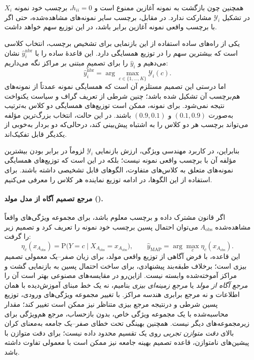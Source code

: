 همچنین چون بازگشت به نمونه آغازین ممنوع است و $h_{ii}=0$، برچسب خود نمونه $X_i$ در تشکیل $\mathscr Y_i$ مشارکت ندارد. در مقابل، برچسب سایر نمونه‌های مشاهده‌شده، حتی اگر با برچسب واقعی نمونه آغازین برابر باشد، در این توزیع سهم خواهد داشت.

یکی از راه‌های ساده استفاده از این بازنمایی برای تشخیص برچسب، انتخاب کلاسی است که بیشترین سهم را در توزیع همسایگی دارد. این قاعدهٔ ساده را با $\widehat y_i^{\mathrm{nbr}}$ نشان می‌دهیم و $\widehat y_i$ را برای تصمیمِ مبتنی بر مراکز نگه می‌داریم:
\begin{equation}\label{eq:ch3-simple-label-decision}
\widehat y_i^{\mathrm{nbr}}=\arg\max_{c\in\{1,\ldots,K\}}\mathscr Y_i(c).
\end{equation}
اما درستی این تصمیم مستلزم آن است که همسایگی نمونه عمدتاً از نمونه‌های هم‌برچسب آن تشکیل شده باشد؛ چنین شرطی از تعریف گراف و سیاست یکنواخت نتیجه نمی‌شود. برای نمونه، ممکن است توزیع‌های همسایگی دو کلاس به‌ترتیب به‌صورت $(0.1,0.9)$ و $(0.9,0.1)$ باشند. در این حالت، انتخاب بزرگ‌ترین مؤلفه می‌تواند برچسب هر دو کلاس را به اشتباه پیش‌بینی کند، درحالی‌که دو بردار به‌خوبی از یکدیگر قابل تفکیک‌اند.

بنابراین، در کاربرد مهندسی ویژگی، ارزش بازنمایی $\mathscr Y_i$ لزوماً در برابر بودن بیشترین مؤلفه آن با برچسب واقعی نمونه نیست؛ بلکه در این است که توزیع‌های همسایگی نمونه‌های متعلق به کلاس‌های متفاوت، الگوهای قابل تشخیصی داشته باشند. برای استفاده از این الگوها، در ادامه توزیع نماینده هر کلاس را معرفی می‌کنیم.


\paragraph{مرجع تصمیم آگاه از مدل مولد ().}
\label{par:ch3-bayes-map-reference}
اگر قانون مشترک داده و برچسب معلوم باشد،
برای مجموعه ویژگی‌های واقعاً مشاهده‌شده
$A_{\mathrm{obs}}$ می‌توان احتمال پسین برچسب
خود نمونه را تعریف کرد و تصمیم زیر را گرفت:
\begin{equation}\label{eq:ch3-bayes-map-decision}
\eta_c(x_{A_{\mathrm{obs}}})
=\mathrm P\bigl(Y=c\mid X_{A_{\mathrm{obs}}}=x_{A_{\mathrm{obs}}}\bigr),
\qquad
\widehat y_{\mathrm{MAP}}
=\arg\max_{c}\eta_c(x_{A_{\mathrm{obs}}}).
\end{equation}
این قاعده، با فرض آگاهی از توزیع واقعی مولد،
برای زیان صفر--یک معمولی تصمیم بیزی است؛
برخلاف طبقه‌بند پیشنهادی، برای ساخت احتمال پسین
به بازنمایی گشت و مراکز آموخته‌شده وابسته نیست.
ازاین‌رو در مقایسه‌های مصنوعی بهتر است
آن را \emph{مرجع آگاه از مولد} یا
\emph{مرجع زمینه‌ای بیزی} بنامیم،
نه یک خط مبنای آموزش‌دیده با همان اطلاعات
و نه مرجع برابری هندسه مراکز.
با تغییر مجموعه ویژگی‌های ورودی، توزیع پسین
شرطی و درنتیجه مرجع بیزی متناظر نیز ممکن است
تغییر کند؛ مقدار محاسبه‌شده با یک مجموعه
ویژگی خاص، بدون بازحساب، مرجع هم‌ویژگی
برای زیرمجموعه‌های دیگر نیست.
همچنین بهینگی تحت خطای صفر--یک جامعه
به‌معنای کران بالای \emph{دقت متوازن تجربی}
روی یک تقسیم محدود داده نیست؛
برای دقت متوازن با پیشین‌های نامتوازن،
قاعده تصمیم بهینه جامعه نیز ممکن است
با  معمولی تفاوت داشته باشد.

